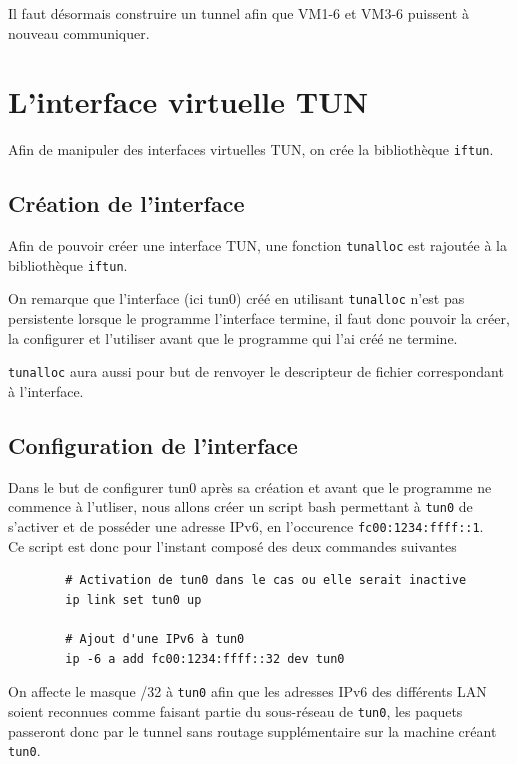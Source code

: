 \documentclass[a4paper, 10pt]{article}
\begin{document}
      Il faut désormais construire un tunnel afin que VM1-6 et VM3-6 puissent à
      nouveau communiquer.

  \section{L'interface virtuelle TUN}
    Afin de manipuler des interfaces virtuelles TUN, on crée la bibliothèque
    \verb+iftun+.

    \subsection{Création de l'interface}
      Afin de pouvoir créer une interface TUN, une fonction \verb+tunalloc+ est
      rajoutée à la bibliothèque \verb+iftun+.

      On remarque que l'interface (ici tun0) créé en utilisant \verb+tunalloc+
      n'est pas persistente lorsque le programme l'interface termine, il faut
      donc pouvoir la créer, la configurer et l'utiliser avant que le programme
      qui l'ai créé ne termine.

      \verb+tunalloc+ aura aussi pour but de renvoyer le descripteur de fichier
      correspondant à l'interface. \\

    \subsection{Configuration de l'interface}
      Dans le but de configurer tun0 après sa création et avant que le programme
      ne commence à l'utliser, nous allons créer un script bash permettant à
      \verb+tun0+ de s'activer et de posséder une adresse IPv6, en l'occurence
      \verb+fc00:1234:ffff::1+. \\

      Ce script est donc pour l'instant composé des deux commandes suivantes
      \begin{verbatim}
        # Activation de tun0 dans le cas ou elle serait inactive
        ip link set tun0 up

        # Ajout d'une IPv6 à tun0
        ip -6 a add fc00:1234:ffff::32 dev tun0
      \end{verbatim}

      On affecte le masque /32 à \verb+tun0+ afin que les adresses IPv6 des
      différents LAN soient reconnues comme faisant partie du sous-réseau de
      \verb+tun0+, les paquets passeront donc par le tunnel sans routage
      supplémentaire sur la machine créant \verb+tun0+.
\end{document}
